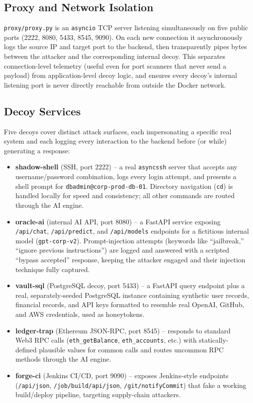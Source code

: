 \documentclass[conference]{IEEEtran}
\begin{document}
\subsection{Proxy and Network Isolation}

\texttt{proxy/proxy.py} is an \texttt{asyncio} TCP server listening
simultaneously on five public ports (2222, 8080, 5433, 8545, 9090). On each
new connection it asynchronously logs the source IP and target port to the
backend, then transparently pipes bytes between the attacker and the
corresponding internal decoy. This separates connection-level telemetry
(useful even for port scanners that never send a payload) from
application-level decoy logic, and ensures every decoy's internal listening
port is never directly reachable from outside the Docker network.

\subsection{Decoy Services}

Five decoys cover distinct attack surfaces, each impersonating a specific
real system and each logging every interaction to the backend before (or
while) generating a response:

\begin{itemize}
\item \textbf{shadow-shell} (SSH, port 2222) -- a real \texttt{asyncssh}
server that accepts any username/password combination, logs every login
attempt, and presents a shell prompt for \texttt{dbadmin@corp-prod-db-01}.
Directory navigation (\texttt{cd}) is handled locally for speed and
consistency; all other commands are routed through the AI engine.
\item \textbf{oracle-ai} (internal AI API, port 8080) -- a FastAPI service
exposing \texttt{/api/chat}, \texttt{/api/predict}, and \texttt{/api/models}
endpoints for a fictitious internal model (\texttt{gpt-corp-v2}).
Prompt-injection attempts (keywords like ``jailbreak,'' ``ignore previous
instructions'') are logged and answered with a scripted ``bypass accepted''
response, keeping the attacker engaged and their injection technique fully
captured.
\item \textbf{vault-sql} (PostgreSQL decoy, port 5433) -- a FastAPI query
endpoint plus a real, separately-seeded PostgreSQL instance containing
synthetic user records, financial records, and API keys formatted to
resemble real OpenAI, GitHub, and AWS credentials, used as honeytokens.
\item \textbf{ledger-trap} (Ethereum JSON-RPC, port 8545) -- responds to
standard Web3 RPC calls (\texttt{eth\_getBalance}, \texttt{eth\_accounts},
etc.) with statically-defined plausible values for common calls and routes
uncommon RPC methods through the AI engine.
\item \textbf{forge-ci} (Jenkins CI/CD, port 9090) -- exposes Jenkins-style
endpoints (\texttt{/api/json}, \texttt{/job/build/api/json},
\texttt{/git/notifyCommit}) that fake a working build/deploy pipeline,
targeting supply-chain attackers.
\end{itemize}
\end{document}
